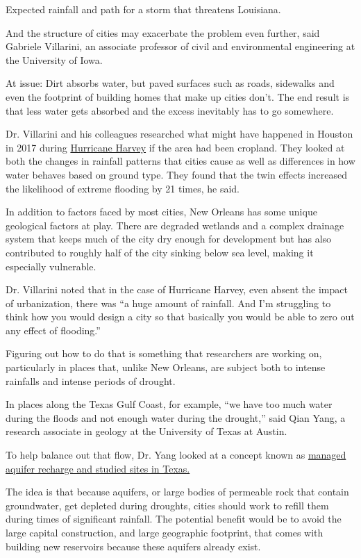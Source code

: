 Expected rainfall and path for a storm that threatens Louisiana.

And the structure of cities may exacerbate the problem even further,
said Gabriele Villarini, an associate professor of civil and
environmental engineering at the University of Iowa.

At issue: Dirt absorbs water, but paved surfaces such as roads,
sidewalks and even the footprint of building homes that make up cities
don't. The end result is that less water gets absorbed and the excess
inevitably has to go somewhere.

Dr. Villarini and his colleagues researched what might have happened in
Houston in 2017 during
\href{https://www.nytimes3xbfgragh.onion/video/us/100000005395222/hurricane-harveys-damage-in-texas.html}{Hurricane
Harvey} if the area had been cropland. They looked at both the changes
in rainfall patterns that cities cause as well as differences in how
water behaves based on ground type. They found that the twin effects
increased the likelihood of extreme flooding by 21 times, he said.

In addition to factors faced by most cities, New Orleans has some unique
geological factors at play. There are degraded wetlands and a complex
drainage system that keeps much of the city dry enough for development
but has also contributed to roughly half of the city sinking below sea
level, making it especially vulnerable.

Dr. Villarini noted that in the case of Hurricane Harvey, even absent
the impact of urbanization, there was ``a huge amount of rainfall. And
I'm struggling to think how you would design a city so that basically
you would be able to zero out any effect of flooding.''

Figuring out how to do that is something that researchers are working
on, particularly in places that, unlike New Orleans, are subject both to
intense rainfalls and intense periods of drought.

In places along the Texas Gulf Coast, for example, ``we have too much
water during the floods and not enough water during the drought,'' said
Qian Yang, a research associate in geology at the University of Texas at
Austin.

To help balance out that flow, Dr. Yang looked at a concept known as
\href{https://iopscience.iop.org/article/10.1088/1748-9326/ab148e}{managed
aquifer recharge and studied sites in Texas.}

The idea is that because aquifers, or large bodies of permeable rock
that contain groundwater, get depleted during droughts, cities should
work to refill them during times of significant rainfall. The potential
benefit would be to avoid the large capital construction, and large
geographic footprint, that comes with building new reservoirs because
these aquifers already exist.


